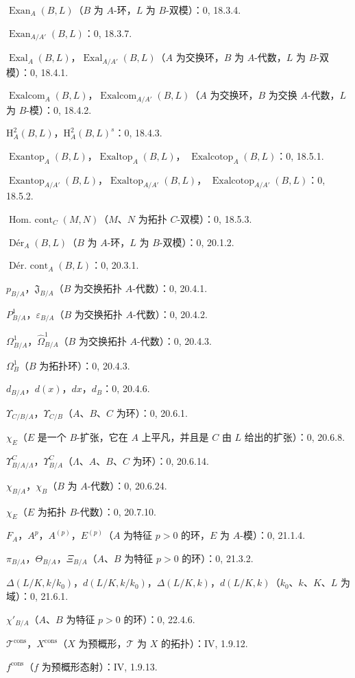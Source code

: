 $\operatorname{Exan}_A(B,L)$（$B$ 为 $A$-环，$L$ 为 $B$-双模）：0, 18.3.4.\par
$\operatorname{Exan}_{A/A'}(B,L)$：0, 18.3.7.\par
$\operatorname{Exal}_A(B,L)$，$\operatorname{Exal}_{A/A'}(B,L)$（$A$ 为交换环，$B$ 为 $A$-代数，$L$ 为 $B$-双模）：0, 18.4.1.\par
$\operatorname{Exalcom}_A(B,L)$，$\operatorname{Exalcom}_{A/A'}(B,L)$（$A$ 为交换环，$B$ 为交换 $A$-代数，$L$ 为 $B$-模）：0, 18.4.2.\par
$\mathrm H_A^2(B,L)$，$\mathrm H_A^2(B,L)^s$：0, 18.4.3.\par
$\operatorname{Exantop}_A(B,L)$，$\operatorname{Exaltop}_A(B,L)$，
$\operatorname{Exalcotop}_A(B,L)$：0, 18.5.1.\par
$\operatorname{Exantop}_{A/A'}(B,L)$，$\operatorname{Exaltop}_{A/A'}(B,L)$，
$\operatorname{Exalcotop}_{A/A'}(B,L)$：0, 18.5.2.\par
$\operatorname{Hom.\ cont}_C(M,N)$（$M$、$N$ 为拓扑 $C$-双模）：0, 18.5.3.\par
$\operatorname{Dér}_A(B,L)$（$B$ 为 $A$-环，$L$ 为 $B$-双模）：0, 20.1.2.\par
$\operatorname{Dér.\ cont}_A(B,L)$：0, 20.3.1.\par
$p_{B/A}$，$\mathfrak J_{B/A}$（$B$ 为交换拓扑 $A$-代数）：0, 20.4.1.\par
$P^1_{B/A}$，$\varepsilon_{B/A}$（$B$ 为交换拓扑 $A$-代数）：0, 20.4.2.\par
$\Omega^1_{B/A}$，$\widehat{\Omega}^1_{B/A}$（$B$ 为交换拓扑 $A$-代数）：0, 20.4.3.\par
$\Omega^1_B$（$B$ 为拓扑环）：0, 20.4.3.\par
$d_{B/A}$，$d(x)$，$dx$，$d_B$：0, 20.4.6.\par
$\Upsilon_{C/B/A}$，$\Upsilon_{C/B}$（$A$、$B$、$C$ 为环）：0, 20.6.1.\par
$\chi_E$（$E$ 是一个 $B$-扩张，它在 $A$ 上平凡，并且是 $C$ 由 $L$ 给出的扩张）：0, 20.6.8.\par

\clearpage
{}
$\Upsilon^C_{B/A/\Lambda}$，$\Upsilon^C_{B/A}$（$\Lambda$、$A$、$B$、$C$ 为环）：0, 20.6.14.\par
$\chi_{B/A}$，$\chi_B$（$B$ 为 $A$-代数）：0, 20.6.24.\par
$\chi_E$（$E$ 为拓扑 $B$-代数）：0, 20.7.10.\par
$F_A$，$A^p$，$A^{(p)}$，$E^{(p)}$（$A$ 为特征 $p>0$ 的环，$E$ 为 $A$-模）：0, 21.1.4.\par
$\pi_{B/A}$，$\Theta_{B/A}$，$\Xi_{B/A}$（$A$、$B$ 为特征 $p>0$ 的环）：0, 21.3.2.\par
$\Delta(L/K,k/k_0)$，$d(L/K,k/k_0)$，$\Delta(L/K,k)$，$d(L/K,k)$（$k_0$、$k$、$K$、$L$ 为域）：0, 21.6.1.\par
$\chi'_{B/A}$（$A$、$B$ 为特征 $p>0$ 的环）：0, 22.4.6.\par
$\mathscr T^{\mathrm{cons}}$，$X^{\mathrm{cons}}$（$X$ 为预概形，$\mathscr T$ 为 $X$ 的拓扑）：IV, 1.9.12.\par
$f^{\mathrm{cons}}$（$f$ 为预概形态射）：IV, 1.9.13.\par


